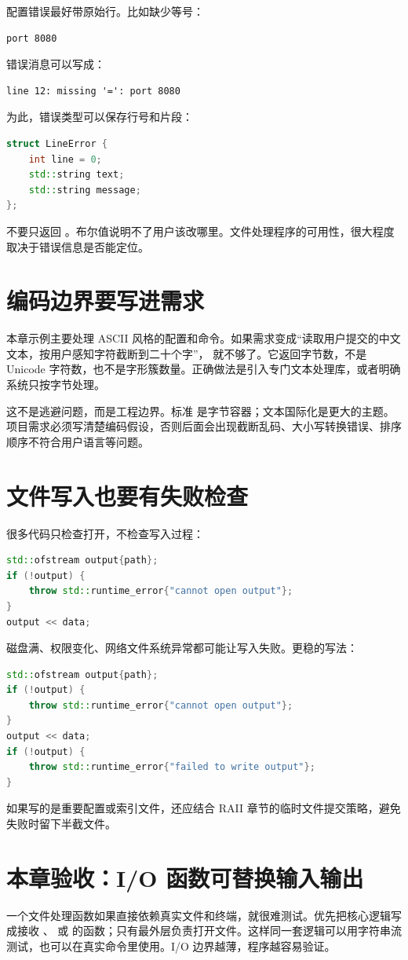 配置错误最好带原始行。比如缺少等号：

\begin{lstlisting}[caption={错误配置行}]
port 8080
\end{lstlisting}

错误消息可以写成：

\begin{lstlisting}[caption={带原始行的错误}]
line 12: missing '=': port 8080
\end{lstlisting}

为此，错误类型可以保存行号和片段：

\begin{lstlisting}[language=C++,caption={带上下文的行错误}]
struct LineError {
    int line = 0;
    std::string text;
    std::string message;
};
\end{lstlisting}

不要只返回 。布尔值说明不了用户该改哪里。文件处理程序的可用性，很大程度取决于错误信息是否能定位。

\section{编码边界要写进需求}

本章示例主要处理 ASCII 风格的配置和命令。如果需求变成“读取用户提交的中文文本，按用户感知字符截断到二十个字”， 就不够了。它返回字节数，不是 Unicode 字符数，也不是字形簇数量。正确做法是引入专门文本处理库，或者明确系统只按字节处理。

这不是逃避问题，而是工程边界。标准  是字节容器；文本国际化是更大的主题。项目需求必须写清楚编码假设，否则后面会出现截断乱码、大小写转换错误、排序顺序不符合用户语言等问题。

\section{文件写入也要有失败检查}

很多代码只检查打开，不检查写入过程：

\begin{lstlisting}[language=C++,caption={只检查打开不够}]
std::ofstream output{path};
if (!output) {
    throw std::runtime_error{"cannot open output"};
}
output << data;
\end{lstlisting}

磁盘满、权限变化、网络文件系统异常都可能让写入失败。更稳的写法：

\begin{lstlisting}[language=C++,caption={写入后检查流状态}]
std::ofstream output{path};
if (!output) {
    throw std::runtime_error{"cannot open output"};
}
output << data;
if (!output) {
    throw std::runtime_error{"failed to write output"};
}
\end{lstlisting}

如果写的是重要配置或索引文件，还应结合 RAII 章节的临时文件提交策略，避免失败时留下半截文件。

\section{本章验收：I/O 函数可替换输入输出}

一个文件处理函数如果直接依赖真实文件和终端，就很难测试。优先把核心逻辑写成接收 、 或  的函数；只有最外层负责打开文件。这样同一套逻辑可以用字符串流测试，也可以在真实命令里使用。I/O 边界越薄，程序越容易验证。
